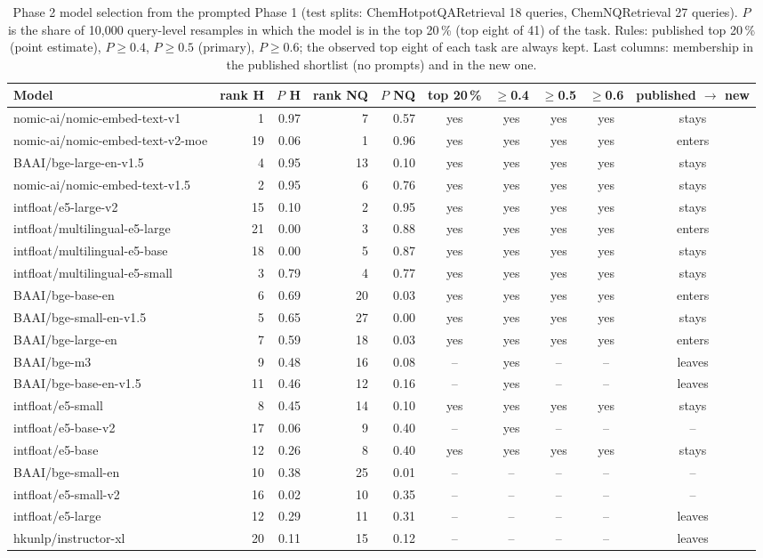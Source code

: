 \begin{table}[htbp]
\centering
\small
\caption{Phase 2 model selection from the prompted Phase 1 (test splits: ChemHotpotQARetrieval 18 queries, ChemNQRetrieval 27 queries). $P$ is the share of 10{,}000 query-level resamples in which the model is in the top 20\,\% (top eight of 41) of the task. Rules: published top 20\,\% (point estimate), $P\ge0.4$, $P\ge0.5$ (primary), $P\ge0.6$; the observed top eight of each task are always kept. Last columns: membership in the published shortlist (no prompts) and in the new one.}
\label{tab:supp_shortlist_selection}
\begin{tabular}{lrrrrccccc}
\toprule
Model & rank H & $P$ H & rank NQ & $P$ NQ & top 20\,\% & $\ge$0.4 & $\ge$0.5 & $\ge$0.6 & published $\to$ new \\
\midrule
nomic-ai/nomic-embed-text-v1 & 1 & 0.97 & 7 & 0.57 & yes & yes & yes & yes & stays \\
nomic-ai/nomic-embed-text-v2-moe & 19 & 0.06 & 1 & 0.96 & yes & yes & yes & yes & enters \\
BAAI/bge-large-en-v1.5 & 4 & 0.95 & 13 & 0.10 & yes & yes & yes & yes & stays \\
nomic-ai/nomic-embed-text-v1.5 & 2 & 0.95 & 6 & 0.76 & yes & yes & yes & yes & stays \\
intfloat/e5-large-v2 & 15 & 0.10 & 2 & 0.95 & yes & yes & yes & yes & stays \\
intfloat/multilingual-e5-large & 21 & 0.00 & 3 & 0.88 & yes & yes & yes & yes & enters \\
intfloat/multilingual-e5-base & 18 & 0.00 & 5 & 0.87 & yes & yes & yes & yes & stays \\
intfloat/multilingual-e5-small & 3 & 0.79 & 4 & 0.77 & yes & yes & yes & yes & stays \\
BAAI/bge-base-en & 6 & 0.69 & 20 & 0.03 & yes & yes & yes & yes & enters \\
BAAI/bge-small-en-v1.5 & 5 & 0.65 & 27 & 0.00 & yes & yes & yes & yes & stays \\
BAAI/bge-large-en & 7 & 0.59 & 18 & 0.03 & yes & yes & yes & yes & enters \\
BAAI/bge-m3 & 9 & 0.48 & 16 & 0.08 & -- & yes & -- & -- & leaves \\
BAAI/bge-base-en-v1.5 & 11 & 0.46 & 12 & 0.16 & -- & yes & -- & -- & leaves \\
intfloat/e5-small & 8 & 0.45 & 14 & 0.10 & yes & yes & yes & yes & stays \\
intfloat/e5-base-v2 & 17 & 0.06 & 9 & 0.40 & -- & yes & -- & -- & -- \\
intfloat/e5-base & 12 & 0.26 & 8 & 0.40 & yes & yes & yes & yes & stays \\
BAAI/bge-small-en & 10 & 0.38 & 25 & 0.01 & -- & -- & -- & -- & -- \\
intfloat/e5-small-v2 & 16 & 0.02 & 10 & 0.35 & -- & -- & -- & -- & -- \\
intfloat/e5-large & 12 & 0.29 & 11 & 0.31 & -- & -- & -- & -- & leaves \\
hkunlp/instructor-xl & 20 & 0.11 & 15 & 0.12 & -- & -- & -- & -- & leaves \\
\bottomrule
\end{tabular}
\end{table}
